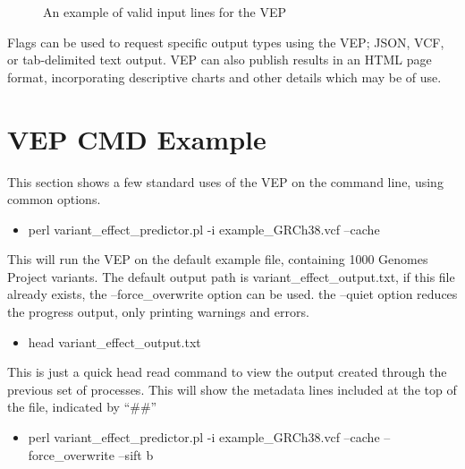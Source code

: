\documentclass[12pt]{report}
\begin{document}
\begin{figure}[ht]
	\centering
	\caption{An example of valid input lines for the VEP}\label{VEP_in}
\end{figure}

Flags can be used to request specific output types using the VEP; JSON, VCF, or tab-delimited text output. VEP can also publish results in an HTML page format, incorporating descriptive charts and other details which may be of use.

\section*{VEP CMD Example}

This section shows a few standard uses of the VEP on the command line, using common options.

\begin{itemize}
	\item perl variant\_effect\_predictor.pl -i example\_GRCh38.vcf --cache
\end{itemize} 

This will run the VEP on the default example file, containing 1000 Genomes Project variants. The default output path is variant\_effect\_output.txt, if this file already exists, the --force\_overwrite option can be used. the --quiet option reduces the progress output, only printing warnings and errors.

\begin{itemize}
	\item head variant\_effect\_output.txt
\end{itemize}

This is just a quick head read command to view the output created through the previous set of processes. This will show the metadata lines included at the top of the file, indicated by ``\#\#''

\begin{itemize}
	\item perl variant\_effect\_predictor.pl -i example\_GRCh38.vcf --cache --force\_overwrite --sift b
\end{itemize}
\end{document}
